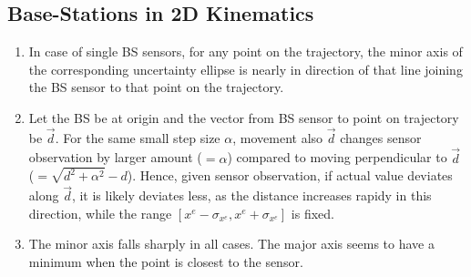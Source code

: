\subsection{Base-Stations in 2D Kinematics}
\begin{enumerate}
    \item In case of single BS sensors, for any point on the trajectory, the minor axis of the corresponding uncertainty ellipse is nearly in direction of that line joining the BS sensor to that point on the trajectory.

    \item Let the BS be at origin and the vector from BS sensor to point on trajectory be $\vec{d}$. For the same small step size $\alpha$, movement also $\vec{d}$ changes sensor observation by larger amount ($= \alpha$) compared to moving perpendicular to $\vec{d}$ ($= \sqrt{d^2 + \alpha^2} - d$). Hence, given sensor observation, if actual value deviates along $\vec{d}$, it is likely deviates less, as the distance increases rapidy in this direction, while the range $[x^e - \sigma_{x^e}, x^e + \sigma_{x^e}]$ is fixed.
    
\item The minor axis falls sharply in all cases. The major axis seems to have a minimum when the point is closest to the sensor.
\end{enumerate}
